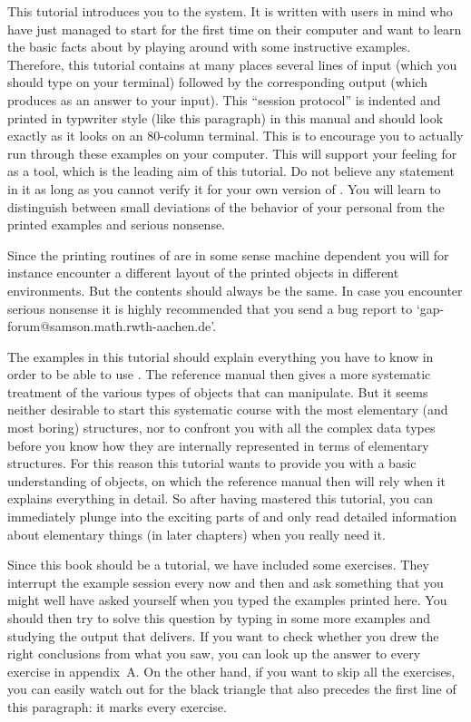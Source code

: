 
This tutorial introduces you to  the {\GAP}  system.  It is written  with
users in mind who have just managed to start {\GAP} for the first time on
their computer and want to learn the basic facts  about {\GAP} by playing
around with some instructive  examples. Therefore, this tutorial contains
at many  places several lines of  input  (which you  should type  on your
terminal) followed by the corresponding output  (which {\GAP} produces as
an answer to your input).
\begintt
     This ``session protocol'' is indented and printed in typwriter
     style (like this paragraph) in this manual and should look exactly
     as it looks on an 80-column terminal.
\endtt
This is  to encourage you to actually  run through these examples on your
computer. This will support your  feeling for {\GAP}  as a tool, which is
the leading aim of this  tutorial. Do not believe any  statement in it as
long  as you cannot verify  it for your own  version of  {\GAP}. You will
learn to distinguish  between small  deviations of  the behavior of  your
personal {\GAP} from the printed examples and serious nonsense.

Since the printing routines of {\GAP} are in some sense machine dependent
you will for instance encounter a different layout of the printed objects
in different environments.  But the  contents should always be the  same.
In case you encounter serious nonsense  it is highly recommended that you
send a bug report to `gap-forum@samson.math.rwth-aachen.de'.

The examples in this tutorial should  explain everything you have to know
in order to be able to use {\GAP}. The reference manual then gives a more
systematic  treatment  of the various types   of  objects that {\GAP} can
manipulate. But   it seems  neither desirable   to  start this systematic
course with the  most elementary  (and  most boring) structures, nor   to
confront you with all the complex data types before you know how they are
internally represented in terms of elementary structures. For this reason
this  tutorial wants to provide you  with a basic understanding of {\GAP}
objects, on which  the reference manual  then will rely  when it explains
everything in  detail.  So after having mastered   this tutorial, you can
immediately  plunge into  the exciting   parts of  {\GAP} and only   read
detailed information about elementary things (in later chapters) when you
really need it.

\fmark Since  this  book  should be a   tutorial,  we have  included some
exercises. They interrupt the example session every  now and then and ask
something that  you might well  have  asked yourself when you  typed  the
examples  printed here.  You should then  try to  solve this  question by
typing  in  some more   examples  and studying  the output    that {\GAP}
delivers. If  you want  to check  whether you  drew the right conclusions
from what you  saw,  you can  look up  the answer  to every   exercise in
appendix~A\null.   On the other   hand, if  you  want   to  skip all  the
exercises, you can   easily watch out for   the black triangle  that also
precedes the first line of this paragraph: it marks every exercise.

